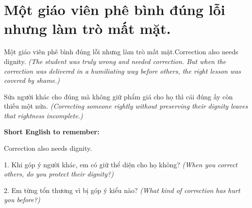 \section{Một giáo viên phê bình đúng lỗi nhưng làm trò mất mặt.}
\begin{truyen}{Một giáo viên phê bình đúng lỗi nhưng làm trò mất mặt.}{Correction also needs dignity.}
\textit{(The student was truly wrong and needed correction. But when the correction was delivered in a humiliating way before others, the right lesson was covered by shame.)}
\end{truyen}
\begin{baihoc}
Sửa người khác cho đúng mà không giữ phẩm giá cho họ thì cái đúng ấy còn thiếu một nửa.
\textit{(Correcting someone rightly without preserving their dignity leaves that rightness incomplete.)}
\end{baihoc}
\begin{ghinhoanh}\textbf{Short English to remember:}

Correction also needs dignity.
\end{ghinhoanh}
\begin{tuhocnhanh}
1. Khi góp ý người khác, em có giữ thể diện cho họ không? \textit{(When you correct others, do you protect their dignity?)}

2. Em từng tổn thương vì bị góp ý kiểu nào? \textit{(What kind of correction has hurt you before?)}
\end{tuhocnhanh}
\ngancach


